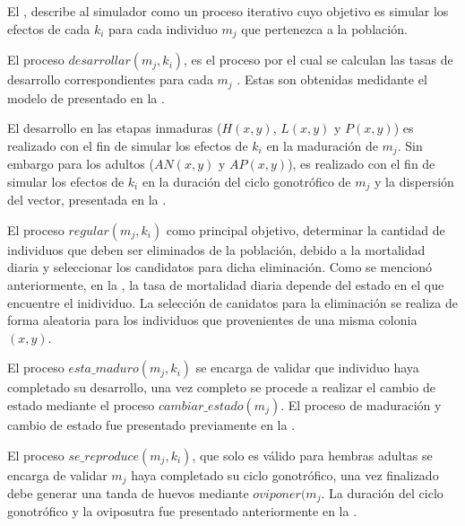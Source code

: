 El , describe al simulador como un proceso iterativo cuyo objetivo
es simular los efectos de cada $k_{i}$ para cada individuo $m_{j}$ que pertenezca a la población.

El proceso $desarrollar(m_{j}, k_{i})$, es el proceso por el cual se calculan las tasas de
desarrollo correspondientes para cada $m_{j}$ . Estas son obtenidas medidante el modelo de
\citet{sharpe1977reaction} presentado en la .

El desarrollo en las etapas inmaduras ($H(x,y)$, $L(x,y)$ y $P(x,y)$) es realizado con el fin de
simular los efectos de $k_{i}$ en la maduración de $m_{j}$. Sin embargo para los adultos ($AN(x,y)$
y $AP(x,y)$), es realizado con el fin de simular los efectos de $k_{i}$ en la duración del ciclo
gonotrófico de $m_{j}$ y la dispersión del vector, presentada en la
.

El proceso $regular(m_{j}, k_{i})$ como principal objetivo, determinar la cantidad de individuos
que deben ser eliminados de la población, debido a la mortalidad diaria y seleccionar los
candidatos para dicha eliminación. Como se mencionó anteriormente, en la
, la tasa de mortalidad diaria depende del estado en el que
encuentre el inidividuo. La selección de canidatos para la eliminación se realiza de forma
aleatoria para los individuos que provenientes de una misma colonia $(x, y)$.

El proceso $esta\_maduro(m_{j}, k_{i})$ se encarga de validar que individuo haya completado su
desarrollo, una vez completo se procede a realizar el cambio de estado mediante el proceso
$cambiar\_estado(m_{j})$. El proceso de maduración y cambio de estado fue presentado previamente
en la .

El proceso $se\_reproduce(m_{j}, k_{i})$, que solo es válido para hembras adultas se encarga de
validar $m_{j}$ haya completado su ciclo gonotrófico, una vez finalizado debe generar una tanda de
huevos mediante $oviponer(m_{j}$. La duración del ciclo gonotrófico y la oviposutra fue presentado
anteriormente en la .
